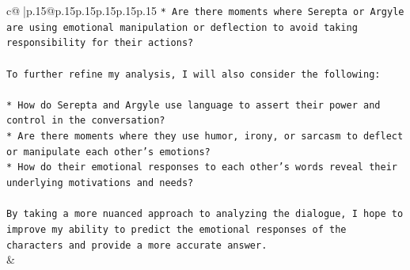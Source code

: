 \documentclass{article}
\begin{document}
{\begin{supertabular}{c@{$\;$}|p{.15\linewidth}@{}p{.15\linewidth}p{.15\linewidth}p{.15\linewidth}p{.15\linewidth}p{.15\linewidth}}
{{{\texttt{* Are there moments where Serepta or Argyle are using emotional manipulation or deflection to avoid taking responsibility for their actions?} \\
\\ 
\texttt{To further refine my analysis, I will also consider the following:} \\
\\ 
\texttt{* How do Serepta and Argyle use language to assert their power and control in the conversation?} \\
\texttt{* Are there moments where they use humor, irony, or sarcasm to deflect or manipulate each other's emotions?} \\
\texttt{* How do their emotional responses to each other's words reveal their underlying motivations and needs?} \\
\\ 
\texttt{By taking a more nuanced approach to analyzing the dialogue, I hope to improve my ability to predict the emotional responses of the characters and provide a more accurate answer.} \\
            }
        }
    }
    & \\ \\

\end{supertabular}
}
\end{document}

